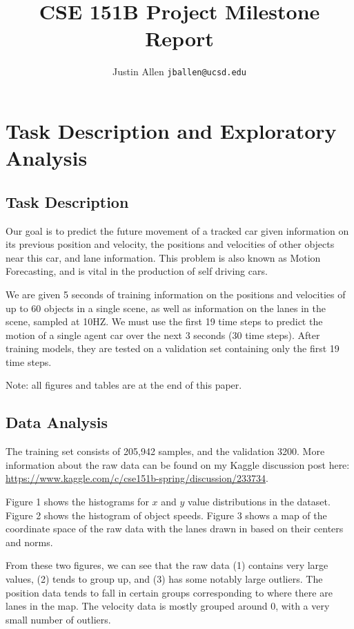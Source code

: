 \documentclass{article}
\title{CSE 151B Project Milestone Report}
\author{%
  Justin Allen
  \texttt{jballen@ucsd.edu}
}
\begin{document}
\maketitle

\section{Task Description and Exploratory Analysis}

\subsection{Task Description}

Our goal is to predict the future movement of a tracked car given information on its previous position and velocity, the positions and velocities of other objects near this car, and lane information. This problem is also known as Motion Forecasting, and is vital in the production of self driving cars.

We are given 5 seconds of training information on the positions and velocities of up to 60 objects in a single scene, as well as information on the lanes in the scene, sampled at 10HZ. We must use the first 19 time steps to predict the motion of a single agent car over the next 3 seconds (30 time steps). After training models, they are tested on a validation set containing only the first 19 time steps.

Note: all figures and tables are at the end of this paper.

\subsection{Data Analysis}

The training set consists of 205,942 samples, and the validation 3200. More information about the raw data can be found on my Kaggle discussion post here: \url{https://www.kaggle.com/c/cse151b-spring/discussion/233734}. 

Figure 1 shows the histograms for $x$ and $y$ value distributions in the dataset. Figure 2 shows the histogram of object speeds. Figure 3 shows a map of the coordinate space of the raw data with the lanes drawn in based on their centers and norms. 

From these two figures, we can see that the raw data (1) contains very large values, (2) tends to group up, and (3) has some notably large outliers. The position data tends to fall in certain groups corresponding to where there are lanes in the map. The velocity data is mostly grouped around 0, with a very small number of outliers. 
\end{document}
